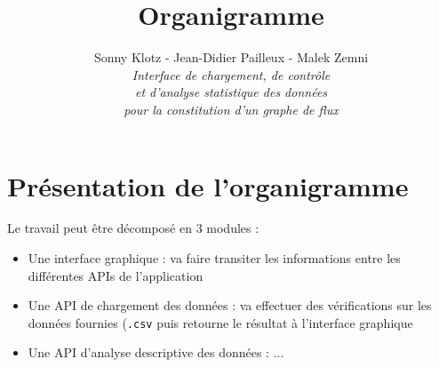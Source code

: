 
\usepackage{tikz}
\usepackage{inputenc}
\usetikzlibrary{arrows,automata}
\usetikzlibrary{positioning}
\geometry{top=3cm,bottom=3cm}

\title{\vspace{\fill}\textbf{\Huge Organigramme}}
\author{Sonny Klotz - Jean-Didier Pailleux - Malek Zemni\vspace{2em}\\\textit{Interface de chargement, de contrôle}\\\textit{et d’analyse statistique des données}\\\textit{pour la constitution d’un graphe de flux}\vspace{2em}}


\maketitle\vspace{\fill}
\newpage
	
	\section{Présentation de l'organigramme}
		Le travail peut être décomposé en 3 modules :
		\begin{itemize}
		\item Une interface graphique : va faire transiter les informations entre les différentes APIs de l'application
		\item Une API de chargement des données : va effectuer des vérifications sur les données fournies (\lstinline!.csv! puis retourne le résultat à l'interface graphique
		\item Une API d'analyse descriptive des données : ...
		\end{itemize}
		
